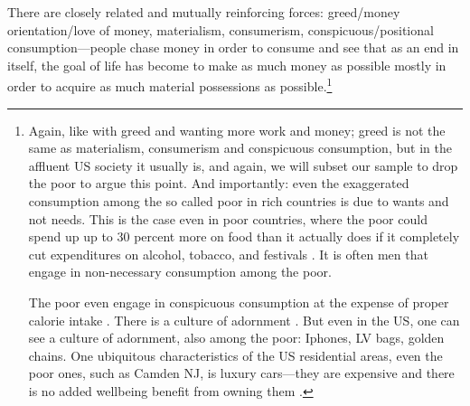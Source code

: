 \documentclass[10pt, letterpaper]{article}
\begin{document}
\begin{spacing}{1.8}
There are closely related and mutually reinforcing forces: greed/money orientation/love of money, materialism, consumerism, conspicuous/positional
consumption---people chase money in order to consume and see that as an end in itself, the goal of life has become to make as much money as possible mostly in
order to acquire as much material possessions as possible.\footnote{Again, like
  with greed and wanting more work and money; greed is not the same as
  materialism, consumerism  and conspicuous consumption, but in the affluent US
  society it usually is, and again, we will subset our sample to drop the poor to argue this point. 
%
And importantly: even the exaggerated consumption among the so called poor in rich countries is due to wants and not needs. This is the case even in poor countries, where the poor could spend up up to 30 percent more on food than it actually does if it completely cut expenditures on alcohol, tobacco, and festivals \citep{banerjee11}.
It is often men that engage in non-necessary consumption among the poor. 

The poor even engage in conspicuous consumption at the expense of proper calorie intake \citep{bellet18}. There is a culture of adornment \citep{cordwell2011fabrics,mascia1992tattoo}. But even in the US, one can see a culture of adornment, also among the poor: Iphones, LV bags, golden chains. %
 One ubiquitous characteristics of the US residential areas, even the poor ones,
 such as Camden NJ, is luxury cars---they are expensive and there is no added    
 wellbeing benefit from owning them \citep{aok_ls_car15}.
}


\end{spacing}
\end{document}
